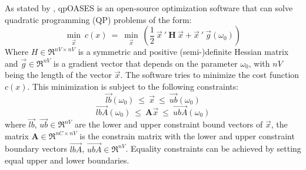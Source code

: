  As stated by \citet{qpoases},  qpOASES is an open-source optimization software that can solve quadratic programming (QP) problems of the form:
\begin{equation}
\underset{\vec{x}}{\min}\ c(x)\ =\  \underset{\vec{x}}{\min}\ \left( \frac{1}{2} \ \vec{x}\ ' \ \textbf{H} \ \vec{x} + \vec{x}\ ' \ \vec{g}(\omega_{0}) \right)
\label{eq:cost_in}
\end{equation}
Where $H \in \Re^{nV\times nV}$ is a symmetric and positive (semi-)definite Hessian matrix and $\vec{g} \in \Re^{nV}$ is a gradient vector that depends on the parameter $\omega_{0}$, with $nV$ being the length of the vector $\vec{x}$. The software tries to minimize the cost function $c(x)$. This minimization is subject to the following constraints:
$$\vec{lb}(\omega_{0})\ \leq\ \vec{x}\ \leq\ \vec{ub}(\omega_{0})$$
$$\vec{lbA}(\omega_{0})\ \leq\ \textbf{A}\vec{x}\ \leq\ \vec{ubA}(\omega_{0})$$
where $\vec{lb}$, $\vec{ub} \in \Re^{nV}$ are the lower and upper constraint bound vectors of $\vec{x}$, the matrix $\textbf{A} \in \Re^{nC\times nV}$ is the constrain matrix with the lower and upper constraint boundary vectors $\vec{lbA}$, $\vec{ubA} \in \Re^{nV}$. Equality constraints can be achieved by setting equal upper and lower boundaries.
 
